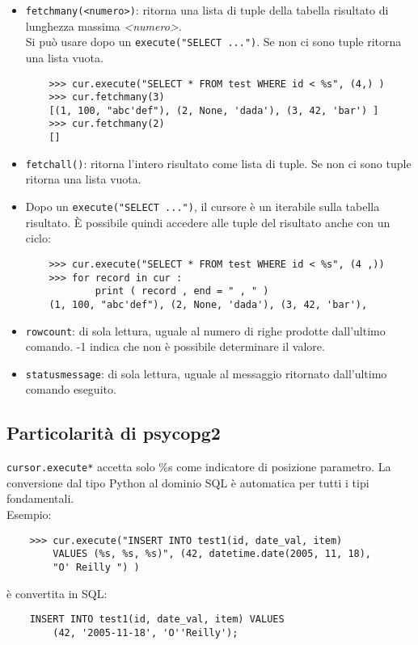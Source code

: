 \documentclass[a4paper, 10pt, titlepage]{article}
\begin{document}
\begin{itemize}
	\item \lstinline|fetchmany(<numero>)|: ritorna una lista di tuple della tabella risultato di lunghezza massima \textit{<numero>}.\\ Si può usare dopo un \lstinline|execute("SELECT ...")|. Se non ci sono tuple ritorna una lista vuota.
	\begin{lstlisting}
	>>> cur.execute("SELECT * FROM test WHERE id < %s", (4,) )
	>>> cur.fetchmany(3)
	[(1, 100, "abc'def"), (2, None, 'dada'), (3, 42, 'bar') ]
	>>> cur.fetchmany(2)
	[]
	\end{lstlisting}
	\item \lstinline|fetchall()|: ritorna l'intero risultato come lista di tuple. Se non ci sono tuple ritorna una lista vuota.
	\item Dopo un \lstinline|execute("SELECT ...")|, il cursore è un iterabile sulla tabella risultato. È possibile quindi accedere alle tuple del risultato anche con un ciclo:
	\begin{lstlisting}
	>>> cur.execute("SELECT * FROM test WHERE id < %s", (4 ,))
	>>> for record in cur :
			print ( record , end = " , " )
	(1, 100, "abc'def"), (2, None, 'dada'), (3, 42, 'bar'),
	\end{lstlisting}
	\item \lstinline|rowcount|: di sola lettura, uguale al numero di righe prodotte dall'ultimo comando. -1 indica che non è possibile determinare il valore.
	\item \lstinline|statusmessage|: di sola lettura, uguale al messaggio ritornato dall’ultimo comando eseguito.
	\end{itemize}
	
	\subsection{Particolarità di psycopg2}
	\lstinline[keywordstyle=\color{black}]|cursor.execute*| accetta solo \%s come indicatore di posizione parametro. La conversione dal tipo Python al dominio SQL è automatica per tutti i tipi fondamentali. \\
	Esempio:
	\begin{lstlisting}
	>>> cur.execute("INSERT INTO test1(id, date_val, item) 
		VALUES (%s, %s, %s)", (42, datetime.date(2005, 11, 18),
		"O' Reilly ") )
	\end{lstlisting}
	è convertita in SQL:
	\begin{lstlisting}
	INSERT INTO test1(id, date_val, item) VALUES 
		(42, '2005-11-18', 'O''Reilly');
	\end{lstlisting}
	
\end{document}
